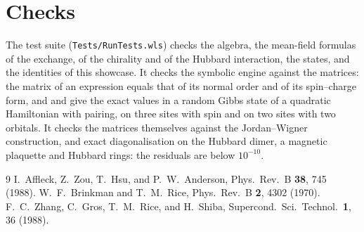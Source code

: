 \documentclass[11pt,a4paper]{article}
\begin{document}
\section{Checks}
The test suite (\texttt{Tests/RunTests.wls}) checks the algebra, the mean-field formulas of the exchange, of the chirality
and of the Hubbard interaction, the states, and the identities of this showcase. It checks the symbolic engine against the
matrices: the matrix of an expression equals that of its normal order and of its spin--charge form, and  and
 give the exact values in a random Gibbs state of a quadratic Hamiltonian with pairing, on three sites with
spin and on two sites with two orbitals. It checks the matrices themselves against the Jordan--Wigner construction, and
exact diagonalisation on the Hubbard dimer, a magnetic plaquette and Hubbard rings: the residuals are below $10^{-10}$.

\begin{thebibliography}{9}\small
{} I.~Affleck, Z.~Zou, T.~Hsu, and P.~W.~Anderson, Phys.\ Rev.\ B {\bf 38}, 745 (1988).
 W.~F.~Brinkman and T.~M.~Rice, Phys.\ Rev.\ B {\bf 2}, 4302 (1970).
 F.~C.~Zhang, C.~Gros, T.~M.~Rice, and H.~Shiba, Supercond.\ Sci.\ Technol.\ {\bf 1}, 36 (1988).
\end{thebibliography}
\end{document}
